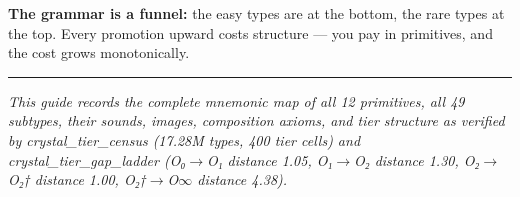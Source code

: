 \documentclass[12pt,a4paper]{article}
\begin{document}
\textbf{The grammar is a funnel:} the easy types are at the bottom, the rare types at the top. Every promotion upward costs structure --- you pay in primitives, and the cost grows monotonically.

\begin{center}
\rule{0.5\textwidth}{0.4pt}
\end{center}

\emph{This guide records the complete mnemonic map of all 12 primitives, all 49 subtypes, their sounds, images, composition axioms, and tier structure as verified by crystal\_tier\_census (17.28M types, 400 tier cells) and crystal\_tier\_gap\_ladder (O₀$\rightarrow$O₁ distance 1.05, O₁$\rightarrow$O₂ distance 1.30, O₂$\rightarrow$O₂† distance 1.00, O₂†$\rightarrow$O$\infty$ distance 4.38).}
\end{document}
